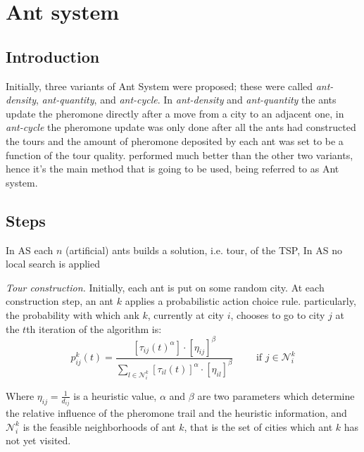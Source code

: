 \documentclass[12pt]{article}
\begin{document}
\section{Ant system}

\subsection{Introduction}
Initially, three variants of Ant System were proposed; these were called \textit{ant-density}, \textit{ant-quantity}, and \textit{ant-cycle}. In \textit{ant-density} and \textit{ant-quantity} the ants update the pheromone directly after a move from a city to an adjacent one, in \textit{ant-cycle} the pheromone update was only done after all the ants had constructed the tours and the amount of pheromone deposited by each ant was set to be a function of the tour quality.  performed much better than the other two variants, hence it's the main method that is going to be used, being referred to as Ant system.

\subsection{Steps}
In AS each \(n\) (artificial) ants builds a solution, i.e. tour, of the TSP, In AS no local search is applied

\textit{Tour construction. } Initially, each ant is put on some random city. At each construction step, an ant \(k\) applies a probabilistic action choice rule. particularly, the probability with which ank \(k\), currently at city \(i\), chooses to go to city \(j\) at the \(t\)th iteration of the algorithm is:
\begin{equation}
    p_{ij}^{k} (t) = \frac{\left[\tau_{ij}(t)^{\alpha}\right] \cdot \left[\eta_{ij}\right]^{\beta}}{\sum_{l \in \mathcal{N}^{k}_{i}} \left[\tau_{il}(t)\right]^{\alpha} \cdot \left[\eta_{il}\right]^{\beta}} \qquad \text{ if } j \in \mathcal{N}^k_i
\end{equation}

Where \(\eta_{ij} = \frac{1}{d_{ij}}\) is a heuristic value, \(\alpha\) and \(\beta\) are two parameters which determine the relative influence of the pheromone trail and the heuristic information, and \(\mathcal{N}^k_i\) is the feasible neighborhoods of ant \(k\), that is the set of cities which ant \(k\) has not yet visited.
\end{document}
